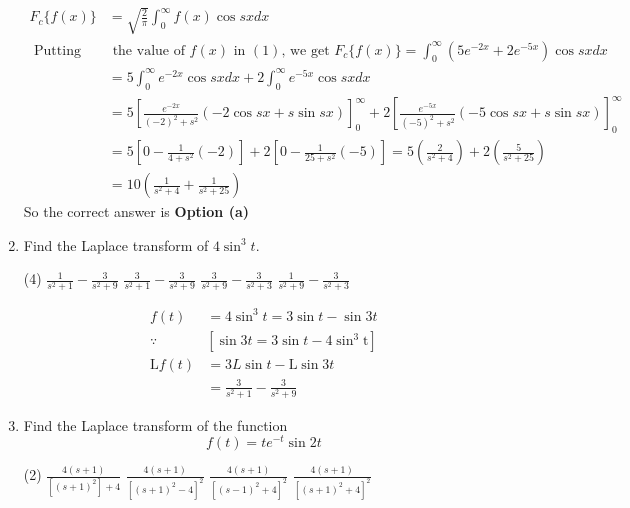 \begin{enumerate}
\begin{answer}
$$\begin{aligned}
	F_{c}\{f(x)\}&=\sqrt{\frac{2}{\pi}} \int_{0}^{\infty} f(x) \cos s x d x\\
	\text { Putting} &\text{ the value of }f(x) \text { in }(1) \text {, we get } F_{c}\{f(x)\}=\int_{0}^{\infty}\left(5 e^{-2 x}+2 e^{-5 x}\right) \cos s x d x\\
	&=5 \int_{0}^{\infty} e^{-2 x} \cos s x d x+2 \int_{0}^{\infty} e^{-5 x} \cos s x d x \\
	&=5\left[\frac{e^{-2 x}}{(-2)^{2}+s^{2}}(-2 \cos s x+s \sin s x)\right]_{0}^{\infty}+2\left[\frac{e^{-5 x}}{(-5)^{2}+s^{2}}(-5 \cos s x+s \sin s x)\right]_{0}^{\infty}\\
	&=5\left[0-\frac{1}{4+s^{2}}(-2)\right]+2\left[0-\frac{1}{25+s^{2}}(-5)\right]=5\left(\frac{2}{s^{2}+4}\right)+2\left(\frac{5}{s^{2}+25}\right) \\
	&=10\left(\frac{1}{s^{2}+4}+\frac{1}{s^{2}+25}\right)
\end{aligned}
$$
	So the correct answer is \textbf{Option (a)}
\end{answer}
\item Find the Laplace transform of $4 \sin ^{3} t$.
\begin{tasks}(4)
	\task[\textbf{a.}]$\frac{1}{s^{2}+1}-\frac{3}{s^{2}+9}$
	\task[\textbf{b.}]$\frac{3}{s^{2}+1}-\frac{3}{s^{2}+9}$
	\task[\textbf{c.}]$\frac{3}{s^{2}+9}-\frac{3}{s^{2}+3}$
	\task[\textbf{d.}] $\frac{1}{s^{2}+9}-\frac{3}{s^{2}+3}$
\end{tasks}
\begin{answer}
	$$\begin{aligned}
	f(t)&=4 \sin ^{3} t=3 \sin t-\sin 3 t\\
	\because &\left[\sin 3 t=3 \sin t-4 \sin ^{3} \mathrm{t}\right]\\
	\mathrm{L} f(t)&=3 L \sin t-\mathrm{L} \sin 3 t\\&=\frac{3}{s^{2}+1}-\frac{3}{s^{2}+9}
\end{aligned}$$
\end{answer}
\item Find the Laplace transform of the function
$$
f(t)=t e^{-t} \sin 2 t
$$
\begin{tasks}(2)
	\task[\textbf{a.}]$\frac{4(s+1)}{\left[(s+1)^{2}\right]+4}$
	\task[\textbf{b.}]$\frac{4(s+1)}{\left[(s+1)^{2}-4\right]^{2}}$
	\task[\textbf{c.}]$\frac{4(s+1)}{\left[(s-1)^{2}+4\right]^{2}}$
	\task[\textbf{d.}] $\frac{4(s+1)}{\left[(s+1)^{2}+4\right]^{2}}$
\end{tasks}
\begin{answer}
	$$
	\begin{aligned}

\end{aligned}$$
\end{answer}
\end{enumerate}
